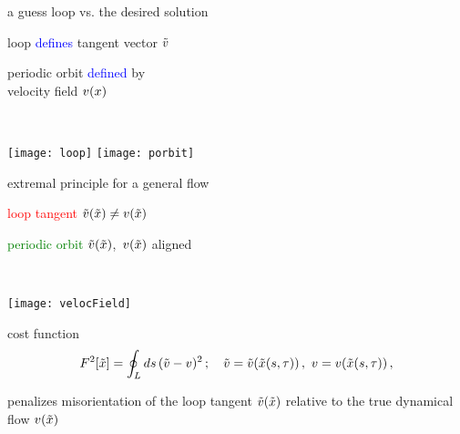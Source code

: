 \begin{frame}{a guess loop vs. the desired solution}
\begin{center}
\begin{minipage}[c]{0.55\textwidth}
\begin{center}

	\vskip 1.5cm

loop \textcolor{blue}{defines}
tangent vector $\tilde{v}$

	\vskip 3cm

periodic orbit \textcolor{blue}{defined} by
\\
velocity field $v(x)$

\end{center}
\end{minipage}%
~~~~~~~\begin{minipage}[c]{0.40\textwidth}
	\begin{center}
	\vskip 10pt
	\texttt{[image: loop]}
	\vskip 1.5cm
	\texttt{[image: porbit]}
	\end{center}
\end{minipage}
\end{center}
\end{frame}


\begin{frame}{extremal principle for a general flow}
\begin{center}
\begin{minipage}[c]{0.55\textwidth}

	\vskip 10pt

\textcolor{red}{loop tangent}
$\tilde{v}(\tilde{x})
	\neq
v(\tilde{x})$

	\vskip 1cm

\textcolor{green}{periodic orbit}
$\tilde{v}(\tilde{x})$,~$v(\tilde{x})$
aligned
\end{minipage}%
~~~~~~~\begin{minipage}[c]{0.40\textwidth}
	\begin{center}
	\vskip 10pt
	\texttt{[image: velocField]}
	\end{center}
\end{minipage}
\end{center}

\begin{block}{cost function}%
\[
F^2[\tilde{x}] =
            \oint_L ds\,(\tilde{v}-v)^2
    \,;\quad
    \tilde{v} = \tilde{v}(\tilde{x}(s,\tau))\,,\,\,
    v = v(\tilde{x}(s,\tau))
\,,
\]
\end{block}

\bigskip

penalizes misorientation of the loop tangent
$\tilde{v}(\tilde{x})$
relative to the true dynamical flow $v(\tilde{x})$
\end{frame}

